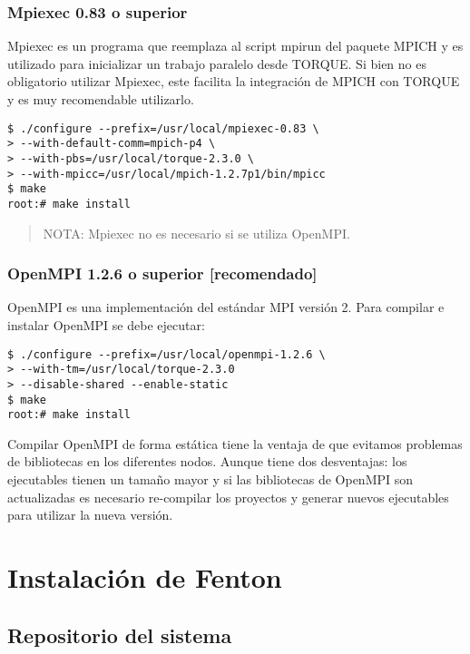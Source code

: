 \documentclass[a4paper,10pt,spanish]{article}
\begin{document}
\subsubsection{Mpiexec 0.83 o superior}

Mpiexec\cite{mpiexec} es un programa que reemplaza al script mpirun del paquete MPICH y es utilizado para inicializar un trabajo paralelo desde TORQUE. Si bien no es obligatorio utilizar Mpiexec, este facilita la integraci\'{o}n de MPICH con TORQUE y es muy recomendable utilizarlo.

\begin{verbatim}
$ ./configure --prefix=/usr/local/mpiexec-0.83 \
> --with-default-comm=mpich-p4 \
> --with-pbs=/usr/local/torque-2.3.0 \
> --with-mpicc=/usr/local/mpich-1.2.7p1/bin/mpicc 
$ make 
root:# make install
\end{verbatim}

\begin{quote}
NOTA: Mpiexec no es necesario si se utiliza OpenMPI.
\end{quote}

\subsubsection{OpenMPI 1.2.6 o superior \small{[recomendado]}}

OpenMPI\cite{openmpi} es una implementaci\'{o}n del est\'{a}ndar MPI versi\'{o}n 2. Para compilar e instalar OpenMPI se debe ejecutar:

\begin{verbatim}
$ ./configure --prefix=/usr/local/openmpi-1.2.6 \
> --with-tm=/usr/local/torque-2.3.0
> --disable-shared --enable-static
$ make
root:# make install
\end{verbatim}

Compilar OpenMPI de forma est\'{a}tica tiene la ventaja de que evitamos problemas de bibliotecas en los diferentes nodos. Aunque tiene dos desventajas: los ejecutables tienen un tama\~{n}o mayor y si las bibliotecas de OpenMPI son actualizadas es necesario re-compilar los proyectos y generar nuevos ejecutables para utilizar la nueva versi\'{o}n.

\section{Instalaci\'{o}n de Fenton}

\subsection{Repositorio del sistema}
\end{document}
